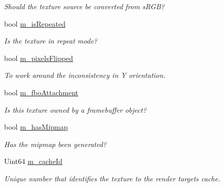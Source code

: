 \begin{DoxyCompactItemize}
\begin{DoxyCompactList}\small\item\em Should the texture source be converted from s\+R\+GB? \end{DoxyCompactList}\item 
\mbox{\label{classsf_1_1_texture_afda596bb862543853907af51914635a9}} 
bool \mbox{\hyperlink{classsf_1_1_texture_afda596bb862543853907af51914635a9}{m\+\_\+is\+Repeated}}
\begin{DoxyCompactList}\small\item\em Is the texture in repeat mode? \end{DoxyCompactList}\item 
\mbox{\label{classsf_1_1_texture_a67c914993bc1f685c2f74452c0ba2df2}} 
bool \mbox{\hyperlink{classsf_1_1_texture_a67c914993bc1f685c2f74452c0ba2df2}{m\+\_\+pixels\+Flipped}}
\begin{DoxyCompactList}\small\item\em To work around the inconsistency in Y orientation. \end{DoxyCompactList}\item 
\mbox{\label{classsf_1_1_texture_adfe15f76648c652a6cc487536209dd55}} 
bool \mbox{\hyperlink{classsf_1_1_texture_adfe15f76648c652a6cc487536209dd55}{m\+\_\+fbo\+Attachment}}
\begin{DoxyCompactList}\small\item\em Is this texture owned by a framebuffer object? \end{DoxyCompactList}\item 
\mbox{\label{classsf_1_1_texture_acafc05b27a5b25ab4baa8718ded25ec0}} 
bool \mbox{\hyperlink{classsf_1_1_texture_acafc05b27a5b25ab4baa8718ded25ec0}{m\+\_\+has\+Mipmap}}
\begin{DoxyCompactList}\small\item\em Has the mipmap been generated? \end{DoxyCompactList}\item 
\mbox{\label{classsf_1_1_texture_afbda0fd347d5fddd8f1b223c7ec6fb6a}} 
Uint64 \mbox{\hyperlink{classsf_1_1_texture_afbda0fd347d5fddd8f1b223c7ec6fb6a}{m\+\_\+cache\+Id}}
\begin{DoxyCompactList}\small\item\em Unique number that identifies the texture to the render target\textquotesingle{}s cache. \end{DoxyCompactList}\end{DoxyCompactItemize}
